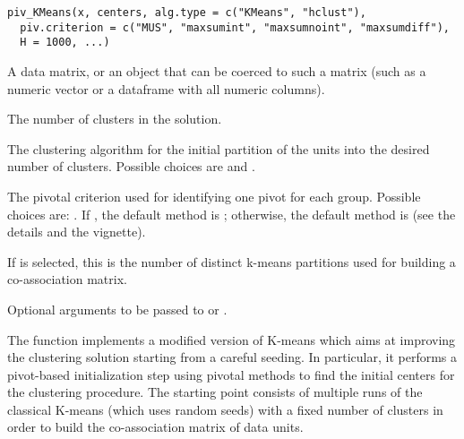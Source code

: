 \documentclass[a4paper]{book}
\begin{document}
%
\begin{Usage}
\begin{verbatim}
piv_KMeans(x, centers, alg.type = c("KMeans", "hclust"),
  piv.criterion = c("MUS", "maxsumint", "maxsumnoint", "maxsumdiff"),
  H = 1000, ...)
\end{verbatim}
\end{Usage}
%
\begin{Arguments}
\begin{ldescription}
\item[\code{x}] A  data matrix, or an object that can be coerced to such a matrix (such as a numeric vector or a dataframe with all numeric columns).

\item[\code{centers}] The number of clusters in the solution.

\item[\code{alg.type}] The clustering algorithm for the initial partition of the
 units into the desired number of clusters.
Possible choices are  and .

\item[\code{piv.criterion}] The pivotal criterion used for identifying one pivot
for each group. Possible choices are: .
If , the default method is ;
otherwise, the default method is  (see the details and
the vignette).

\item[\code{H}] If  is selected, this is the number of
distinct k-means partitions used for building a 
co-association matrix.

\item[\code{...}] Optional arguments to be passed to  or .
\end{ldescription}
\end{Arguments}
%
\begin{Details}\relax
The function implements a modified version of K-means which aims at
improving the clustering solution starting from a careful seeding.
In particular, it performs a pivot-based initialization step
using pivotal methods to find the initial centers
for the clustering procedure. The starting point consists of multiple
runs of the classical K-means (which uses random seeds)
with a fixed number of clusters
in order to build the co-association matrix of data units.
\end{Details}
\end{document}
